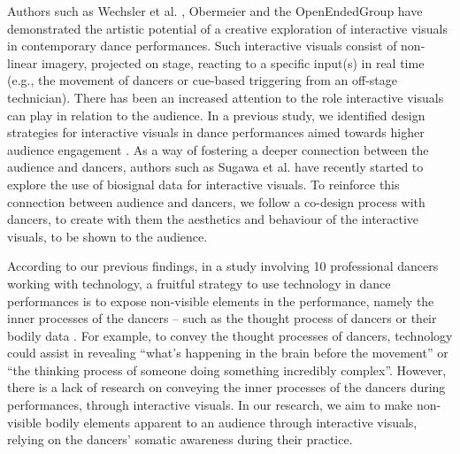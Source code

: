 Authors such as Wechsler et al. \cite{weis_eyecon_2004}, Obermeier \cite{monteverdi_klaus_2007} and the OpenEndedGroup \cite{downie_choreographing_2005} have demonstrated the artistic potential of a creative exploration of interactive visuals in contemporary dance performances. Such interactive visuals consist of non-linear imagery, projected on stage, reacting to a specific input(s) in real time (e.g., the movement of dancers or cue-based triggering from an off-stage technician). There has been an increased attention to the role interactive visuals can play in relation to the audience. In a previous study, we identified design strategies for interactive visuals in dance performances aimed towards higher audience engagement \cite{correia_connected_2021}. As a way of fostering a deeper connection between the audience and dancers, authors such as Sugawa et al. \cite{sugawa_boiling_2021} have recently started to explore the use of biosignal data for interactive visuals. To reinforce this connection between audience and dancers, we follow a co-design process with dancers, to create with them the aesthetics and behaviour of the interactive visuals, to be shown to the audience.

According to our previous findings, in a study involving 10 professional dancers working with technology, a fruitful strategy to use technology in dance performances is to expose non-visible elements in the performance, namely the inner processes of the dancers – such as the thought process of dancers or their bodily data \cite{masu_how_2019}. For example, to convey the thought processes of dancers, technology could assist in revealing “what’s happening in the brain before the movement” or “the thinking process of someone doing something incredibly complex”.
However, there is a lack of research on conveying the inner processes of the dancers during performances, through interactive visuals. In our research, we aim to make non-visible bodily elements apparent to an audience through interactive visuals, relying on the dancers’ somatic awareness during their practice.



